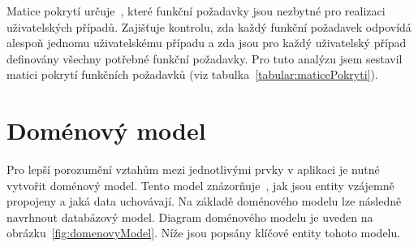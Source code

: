 Matice pokrytí určuje~\cite{uml_2007}, které funkční požadavky jsou nezbytné pro realizaci uživatelských případů. 
Zajišťuje kontrolu, zda každý funkční požadavek odpovídá alespoň jednomu uživatelskému případu a zda jsou pro každý uživatelský případ definovány všechny potřebné funkční požadavky. 
Pro tuto analýzu jsem sestavil matici pokrytí funkčních požadavků (viz tabulka~\ref{tabular:maticePokryti}).

\section{Doménový model}\label{text:analyza/datovymodel}

Pro lepší porozumění vztahům mezi jednotlivými prvky v aplikaci je nutné vytvořit doménový model. Tento model znázorňuje~\cite{uml_2007}, jak jsou entity vzájemně propojeny a jaká data uchovávají. Na základě doménového modelu lze následně navrhnout databázový model. Diagram doménového modelu je uveden na obrázku~\ref{fig:domenovyModel}. Níže jsou popsány klíčové entity tohoto modelu.

